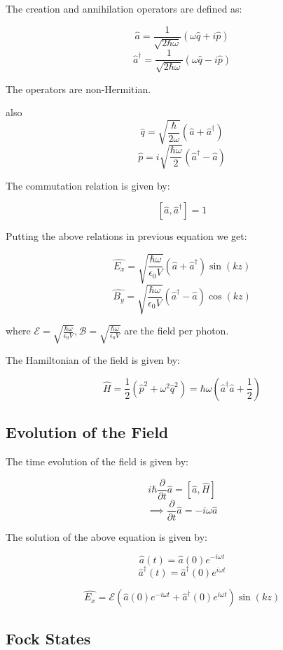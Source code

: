\documentclass[
  letterpaper,
  DIV=11,
  numbers=noendperiod]{scrreprt}
\begin{document}
The creation and annihilation operators are defined as:

\[ \hat{a} = \frac{1}{\sqrt{2\hbar\omega}} (\omega \hat{q} + i\hat{p}) \]
\[ \hat{a}^\dagger = \frac{1}{\sqrt{2\hbar\omega}} (\omega \hat{q} - i\hat{p}) \]

The operators are non-Hermitian.

also
\[ \hat{q} = \sqrt{\frac{\hbar}{2\omega}} (\hat{a} + \hat{a}^\dagger) \]
\[ \hat{p} = i\sqrt{\frac{\hbar\omega}{2}} (\hat{a}^\dagger - \hat{a}) \]

The commutation relation is given by:

\[ [\hat{a}, \hat{a}^\dagger] = 1 \]

Putting the above relations in previous equation we get:

\[ \hat{E_x} = \sqrt{\frac{\hbar \omega}{\epsilon_0 V}} (\hat{a} + \hat{a}^\dagger) \sin(kz) \]
\[ \hat{B_y} = \sqrt{\frac{\hbar \omega}{\epsilon_0 V}} (\hat{a}^\dagger - \hat{a}) \cos(kz) \]

where
\(\mathcal{E} = \sqrt{\frac{\hbar \omega}{\epsilon_0 V}}, \mathcal{B} = \sqrt{\frac{\hbar \omega}{\epsilon_0 V}}\)
are the field per photon.

The Hamiltonian of the field is given by:

\[ \hat{H} = \frac{1}{2}(\hat{p}^2 + \omega^2 \hat{q}^2) = \hbar \omega (\hat{a}^\dagger \hat{a} + \frac{1}{2}) \]

\subsection*{Evolution of the Field}\label{evolution-of-the-field}

The time evolution of the field is given by:

\[ i\hbar \frac{\partial}{\partial t}\hat{a} = [\hat{a}, \hat{H}] \]
\[ \implies \frac{\partial}{\partial t}\hat{a} = -i\omega \hat{a} \]

The solution of the above equation is given by:

\[ \hat{a}(t) = \hat{a}(0) e^{-i\omega t} \]
\[ \hat{a}^\dagger(t) = \hat{a}^\dagger(0) e^{i\omega t} \]

\[\hat{E_x} = \mathcal{E}(\hat{a}(0)e^{-i\omega t} + \hat{a}^\dagger(0)e^{i\omega t}) \sin(kz)\]

\subsection*{Fock States}\label{fock-states}
\end{document}

